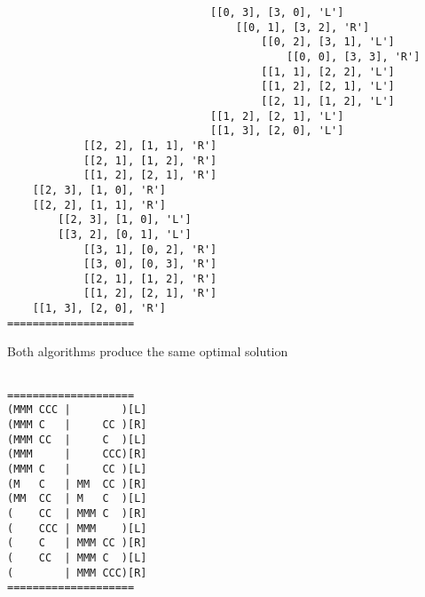 \documentclass{article}
\begin{document}
\begin{verbatim}
                                [[0, 3], [3, 0], 'L']
                                    [[0, 1], [3, 2], 'R']
                                        [[0, 2], [3, 1], 'L']
                                            [[0, 0], [3, 3], 'R']
                                        [[1, 1], [2, 2], 'L']
                                        [[1, 2], [2, 1], 'L']
                                        [[2, 1], [1, 2], 'L']
                                [[1, 2], [2, 1], 'L']
                                [[1, 3], [2, 0], 'L']
            [[2, 2], [1, 1], 'R']
            [[2, 1], [1, 2], 'R']
            [[1, 2], [2, 1], 'R']
    [[2, 3], [1, 0], 'R']
    [[2, 2], [1, 1], 'R']
        [[2, 3], [1, 0], 'L']
        [[3, 2], [0, 1], 'L']
            [[3, 1], [0, 2], 'R']
            [[3, 0], [0, 3], 'R']
            [[2, 1], [1, 2], 'R']
            [[1, 2], [2, 1], 'R']
    [[1, 3], [2, 0], 'R']
====================

\end{verbatim}
\newpage
Both algorithms produce the same optimal solution
\begin{verbatim}

====================
(MMM CCC |        )[L]
(MMM C   |     CC )[R]
(MMM CC  |     C  )[L]
(MMM     |     CCC)[R]
(MMM C   |     CC )[L]
(M   C   | MM  CC )[R]
(MM  CC  | M   C  )[L]
(    CC  | MMM C  )[R]
(    CCC | MMM    )[L]
(    C   | MMM CC )[R]
(    CC  | MMM C  )[L]
(        | MMM CCC)[R]
====================
\end{verbatim}
\end{document}
